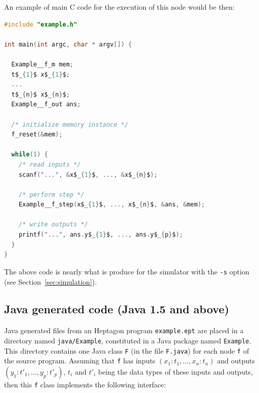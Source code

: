 \documentclass[a4paper]{article}
\begin{document}
An example of main C code for the execution of this node would be then:
\begin{lstlisting}[language=C]
#include "example.h"

int main(int argc, char * argv[]) {
  
  Example__f_m mem;
  t$_{1}$ x$_{1}$;
  ...
  t$_{n}$ x$_{n}$;
  Example__f_out ans;

  /* initialize memory instance */
  f_reset(&mem);
  
  while(1) {
    /* read inputs */
    scanf("...", &x$_{1}$, ..., &x$_{n}$);

    /* perform step */
    Example__f_step(x$_{1}$, ..., x$_{n}$, &ans, &mem);

    /* write outputs */
    printf("...", ans.y$_{1}$, ..., ans.y$_{p}$);
  }
}
\end{lstlisting}

The above code is nearly what is produce for the simulator with the \texttt{-s}
option (see Section~\ref{sec:simulation}).




\subsection{Java generated code (Java 1.5 and above)}
\label{sec:java-generated-code}

Java generated files from an Heptagon program \texttt{example.ept} are placed in
a directory named \texttt{java/Example}, constituted in a Java package named
\texttt{Example}. This directory contains one Java class \texttt{F} (in the file
\texttt{F.java}) for each node \texttt{f} of the source program. Assuming that
\texttt{f} has inputs $(x_1:t_1,\ldots,x_n:t_n)$ and outputs
$(y_1:t'_1,\ldots,y_p:t'_p)$, $t_i$ and $t'_i$ being the data types of these
inputs and outputs, then this \texttt{f} class implements the following
interface:
\end{document}
